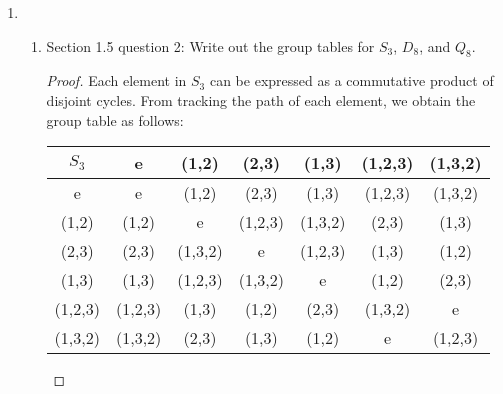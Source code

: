 \documentclass{article}
\begin{document}
\begin{enumerate}
  \item
    \begin{enumerate}
      \item Section 1.5 question 2: Write out the group tables for $S_3$,
        $D_8$, and $Q_8$. \label{part_5a}
        \begin{proof}
          Each element in $S_3$ can be expressed as a commutative product
          of disjoint cycles. From tracking the path of each element, we
          obtain the group table as follows:
          \begin{center}
            \begin{tabular}{|c||c|c|c|c|c|c|}
              \hline
              $S_3$     & e       & (1,2)   & (2,3)   & (1,3)   & (1,2,3) & (1,3,2) \\
              \hline\hline
              e         & e       & (1,2)   & (2,3)   & (1,3)   & (1,2,3) & (1,3,2) \\
              \hline
              (1,2)     & (1,2)   & e       & (1,2,3) & (1,3,2) & (2,3)   & (1,3) \\
              \hline
              (2,3)     & (2,3)   & (1,3,2) & e       & (1,2,3) & (1,3)   & (1,2) \\
              \hline
              (1,3)     & (1,3)   & (1,2,3) & (1,3,2) & e       & (1,2)   & (2,3) \\
              \hline
              (1,2,3)   & (1,2,3) & (1,3)   & (1,2)   & (2,3)   & (1,3,2) & e \\
              \hline
              (1,3,2)   & (1,3,2) & (2,3)   & (1,3)   & (1,2)   & e       & (1,2,3) \\
              \hline
            \end{tabular}
          \end{center}


\end{proof}
\end{enumerate}
\end{enumerate}
\end{document}
